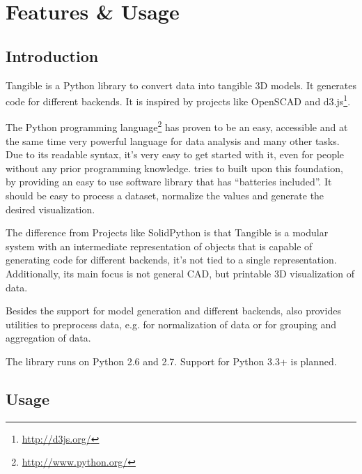 
\chapter{Features {\&} Usage}

\label{ch:features}


\section{Introduction}\label{sec:features:introduction}

Tangible is a Python library to convert data into tangible 3D models. It
generates code for different backends. It is inspired by projects like OpenSCAD
and d3.js\footnote{\url{http://d3js.org/}}.

The Python programming language\footnote{\url{http://www.python.org/}} has
proven to be an easy, accessible and at the same time very powerful language for
data analysis and many other tasks. Due to its readable syntax, it's very easy
to get started with it, even for people without any prior programming knowledge.
\tangible{} tries to built upon this foundation, by providing an easy to use
software library that has ``batteries included''. It should be easy to process a
dataset, normalize the values and generate the desired visualization.

The difference from Projects like SolidPython is that Tangible is a modular
system with an intermediate representation of objects that is capable of
generating code for different backends, it's not tied to a single
representation. Additionally, its main focus is not general CAD, but printable
3D visualization of data.

Besides the support for model generation and different backends, \tangible{}
also provides utilities to preprocess data, e.g. for normalization of data or
for grouping and aggregation of data.

The library runs on Python 2.6 and 2.7. Support for Python 3.3+ is planned.


\section{Usage}\label{sec:features:usage}

